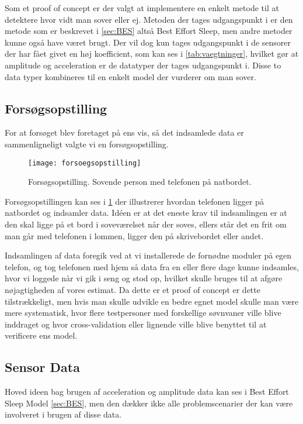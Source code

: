 Som et proof of concept er der valgt at implementere en enkelt metode til at detektere hvor vidt man sover eller ej.
Metoden der tages udgangspunkt i er den metode som er beskrevet i \cref{sec:BES} altså Best Effort Sleep, men andre metoder kunne også have været brugt.
Der vil dog kun tages udgangspunkt i de sensorer der har fået givet en høj koefficient, som kan ses i \cref{tab:vaegtninger}, hvilket gør at amplitude og acceleration er de datatyper der tages udgangspunkt i.
Disse to data typer kombineres til en enkelt model der vurderer om man sover.

\subsection{Forsøgsopstilling}
For at forsøget blev foretaget på ens vis, så det indsamlede data er sammenligneligt valgte vi en forsøgsopstilling.
\begin{figure}[h]
	\centering
	\texttt{[image: forsoegsopstilling]}
	\caption{Forsøgsopstilling. Sovende person med telefonen på natbordet.}
	\label{fig:forsoegopstillings}
\end{figure}

Forsøgsopstillingen kan ses i \cref{fig:forsoegopstillings} der illustrerer hvordan telefonen ligger på natbordet og indsamler data.
Idéen er at det eneste krav til indsamlingen er at den skal ligge på et bord i soveværelset når der soves, ellers står det en frit om man går med telefonen i lommen, ligger den på skrivebordet eller andet.

Indsamlingen af data foregik ved at vi installerede de fornødne moduler på egen telefon, og tog telefonen med hjem så data fra en eller flere dage kunne indsamles, hvor vi loggede når vi gik i seng og stod op, hvilket skulle bruges til at afgøre nøjagtigheden af vores estimat.
Da dette er et proof of concept er dette tilstrækkeligt, men hvis man skulle udvikle en bedre egnet model skulle man være mere systematisk, hvor flere testpersoner med forskellige søvnvaner ville blive inddraget og hvor cross-validation eller lignende ville blive benyttet til at verificere ens model.

\subsection{Sensor Data}
Hoved ideen bag brugen af acceleration og amplitude data kan ses i Best Effort Sleep Model \cref{sec:BES}, men den dækker ikke alle problemscenarier der kan være involveret i brugen af disse data.

